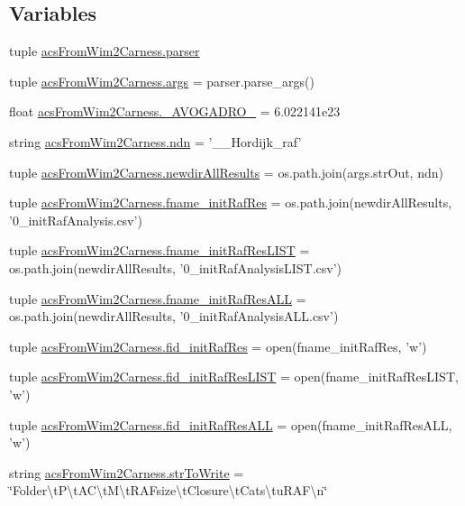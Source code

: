\subsection*{Variables}
\begin{DoxyCompactItemize}
\item 
tuple \hyperlink{a00126_aed93287ef2c9a4a9ba68f8ffc75aae17}{acs\-From\-Wim2\-Carness.\-parser}
\item 
tuple \hyperlink{a00126_ac4c461267ee7f11bbe525de64f56cd10}{acs\-From\-Wim2\-Carness.\-args} = parser.\-parse\-\_\-args()
\item 
float \hyperlink{a00126_abfe2f871ea28e48198cdd5799807de5b}{acs\-From\-Wim2\-Carness.\-\_\-\-A\-V\-O\-G\-A\-D\-R\-O\-\_\-} = 6.\-022141e23
\item 
string \hyperlink{a00126_a6f995419ddd7f2de58506d9541238dbc}{acs\-From\-Wim2\-Carness.\-ndn} = '\-\_\-\_\-\-Hordijk\-\_\-raf'
\item 
tuple \hyperlink{a00126_a4af2fb5abbd4a6e8930401e66af5b79d}{acs\-From\-Wim2\-Carness.\-newdir\-All\-Results} = os.\-path.\-join(args.\-str\-Out, ndn)
\item 
tuple \hyperlink{a00126_a6df9226d812c675c76a936c215c07e53}{acs\-From\-Wim2\-Carness.\-fname\-\_\-init\-Raf\-Res} = os.\-path.\-join(newdir\-All\-Results, '0\-\_\-init\-Raf\-Analysis.\-csv')
\item 
tuple \hyperlink{a00126_a69f06c42408f8a1ae74e34daa83402b7}{acs\-From\-Wim2\-Carness.\-fname\-\_\-init\-Raf\-Res\-L\-I\-S\-T} = os.\-path.\-join(newdir\-All\-Results, '0\-\_\-init\-Raf\-Analysis\-L\-I\-S\-T.\-csv')
\item 
tuple \hyperlink{a00126_a89c98e628d7938077b4ed18215d4fd9b}{acs\-From\-Wim2\-Carness.\-fname\-\_\-init\-Raf\-Res\-A\-L\-L} = os.\-path.\-join(newdir\-All\-Results, '0\-\_\-init\-Raf\-Analysis\-A\-L\-L.\-csv')
\item 
tuple \hyperlink{a00126_a2f9cfe05abfed3ab6326d0cb094c7c80}{acs\-From\-Wim2\-Carness.\-fid\-\_\-init\-Raf\-Res} = open(fname\-\_\-init\-Raf\-Res, 'w')
\item 
tuple \hyperlink{a00126_a7af2668de12720f3c7925527002d81b0}{acs\-From\-Wim2\-Carness.\-fid\-\_\-init\-Raf\-Res\-L\-I\-S\-T} = open(fname\-\_\-init\-Raf\-Res\-L\-I\-S\-T, 'w')
\item 
tuple \hyperlink{a00126_add1c3bb75f1d98889c27099fc14fc6a8}{acs\-From\-Wim2\-Carness.\-fid\-\_\-init\-Raf\-Res\-A\-L\-L} = open(fname\-\_\-init\-Raf\-Res\-A\-L\-L, 'w')
\item 
string \hyperlink{a00126_a34b3667c3c217a35a0e9b71458d2b233}{acs\-From\-Wim2\-Carness.\-str\-To\-Write} = \char`\"{}Folder\textbackslash{}t\-P\textbackslash{}t\-A\-C\textbackslash{}t\-M\textbackslash{}t\-R\-A\-Fsize\textbackslash{}t\-Closure\textbackslash{}t\-Cats\textbackslash{}tu\-R\-A\-F\textbackslash{}n\char`\"{}

\end{DoxyCompactItemize}
